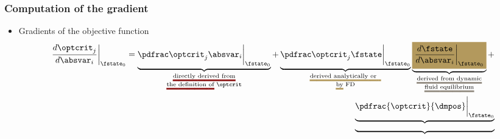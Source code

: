 \def\PstructdispBYabsvarI{\pdfrac{\structdisp} {\absvar_i}}
\def\PmmsBYabsvarI       {\pdfrac{\mms}        {\absvar_i}}
\def\PfstateBYabsvarI    {\pdfrac{\fstate}     {\absvar_i}}


\begin{frame}
  \frametitle{Computation of the gradient}
  
  \begin{itemize}  
    \item Gradients of the objective function
			\begin{align*}\label{eq:sensitivity_startingpoint}
			\DoptcritJBYabsvarI\bigg\rvert_{\fstate_0}=\setulcolor{primary_0}\setul{}{2pt}
			\underbrace{\PoptcritJBYabsvarI\bigg\rvert_{\fstate_0}}_{
			                                                        \substack{
			                                                                 \text{\ul{directly derived from}} \\
			                                                                 \text{\ul{the definition of} $\optcrit$}
			                                                                 } 
			                                                        }  +
			\underbrace{\PoptcritJBYfstate\bigg\rvert_{\fstate_0}}_ {\setulcolor{neutral_1}
			                                                        \substack{
			                                                                 \text{\ul{derived analytically or~~}}\\
			                                                                 \text{\ul{by} FD}
			                                                                 }
			                                                        }
			\underbrace{\hle{neutral_1}{\DfstateBYabsvarI\bigg\rvert_{\fstate_0}}}_  {\setulcolor{neutral_2}
			                                                        \substack{
			                                                                 \text{\ul{derived from dynamic}}\\
			                                                                 \text{\ul{fluid equilibrium}}
			                                                                 }
			                                                        } + \\
			\underbrace{\underbrace{\pdfrac{\optcrit}{\dmpos}\bigg\rvert_{\fstate_0}}_ {\setulcolor{neutral_1}
			                                                        \substack{
}}}
\end{align*}
\end{itemize}
\end{frame}

